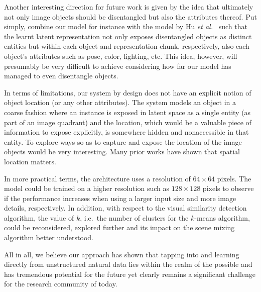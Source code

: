 \documentclass[a4paper,12pt]{report}
\begin{document}
Another interesting direction for future work is given by the idea that ultimately not only image objects should be disentangled but also the attributes thereof. Put simply, combine our model for instance with the model by Hu \textit{et al.}~\cite{DisentFacOfVarByMixTh} such that the learnt latent representation not only exposes disentangled objects as distinct entities but within each object and representation chunk, respectively, also each object's attributes such as pose, color, lighting, etc. This idea, however, will presumably be very difficult to achieve considering how far our model has managed to even disentangle objects.

In terms of limitations, our system by design does not have an explicit notion of object location (or any other attributes). The system models an object in a coarse fashion where an instance is exposed in latent space as a single entity (as part of an image quadrant) and the location, which would be a valuable piece of information to expose explicitly, is somewhere hidden and nonaccessible in that entity. To explore ways so as to capture and expose the location of the image objects would be very interesting. Many prior works have shown that spatial location matters.

In more practical terms, the architecture uses a resolution of $64 \times 64$ pixels. The model could be trained on a higher resolution such as $128 \times 128$ pixels to observe if the performance increases when using a larger input size and more image details, respectively. In addition, with respect to the visual similarity detection algorithm, the value of $k$, i.e.\ the number of clusters for the $k$-means algorithm, could be reconsidered, explored further and its impact on the scene mixing algorithm better understood.

\vspace{5mm}
All in all, we believe our approach has shown that tapping into and learning directly from unstructured natural data lies within the realm of the possible and has tremendous potential for the future yet clearly remains a significant challenge for the research community of today.


\end{document}
